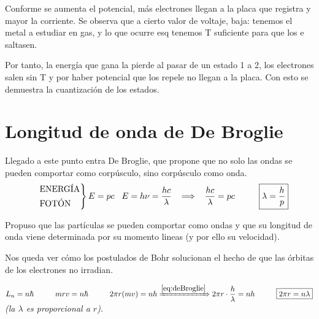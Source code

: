 \documentclass{report}
\begin{document}
    \noindent Conforme se aumenta el potencial, más electrones llegan a la placa que 
    registra y mayor la corriente. Se observa que a cierto valor de voltaje, baja: 
    tenemos el metal a estudiar en gas, y lo que ocurre esq tenemos T suficiente para 
    que los e saltasen. 

    \vspace{0.4cm} \noindent Por tanto, la energía que gana la pierde al pasar de un 
    estado 1 a 2, los electrones salen sin T y por haber potencial que los repele no 
    llegan a la placa. Con esto se demuestra la cuantización de los estados. 

  \section{Longitud de onda de De Broglie}
    \noindent Llegado a este punto entra De Broglie, que propone que no solo las ondas 
    se pueden comportar como corpúsculo, sino corpúsculo como onda.\\
    
    
    \noindent 
    \begin{equation}
      \begin{rcases}
        &\text{ENERGÍA}\\
        &\text{FOTÓN}
      \end{rcases}
      E=pc\hspace{0.3cm}E=h\nu=\dfrac{hc}{\lambda}\hspace{0.2cm}\implies\hspace{0.2cm}
      \dfrac{hc}{\lambda}=pc\hspace{1cm}\boxed{\lambda=\dfrac{h}{p}}
      \label{eq:deBroglie}
    \end{equation}

    \vspace{0.4cm}
    \noindent Propuso que las partículas se pueden comportar como ondas y que su 
    longitud de onda viene determinada por su momento lineas (y por ello su velocidad).

    \vspace{0.8cm}
    \noindent Nos queda ver cómo los postulados de Bohr solucionan el hecho de que las 
    órbitas de los electrones no irradian.

    \noindent $L_n=n\hbar\hspace{1cm}mrv=n\hbar\hspace{1cm}2\pi r(mv)=nh
    \xRightarrow{\ref{eq:deBroglie}}2\pi r \cdot \dfrac{h}{\lambda}=nh
    \hspace{1cm}\boxed{2\pi r =n\lambda}$ 
    \hspace{0.6cm} \textit{(la $\lambda$ es proporcional a $r$).}
\end{document}
